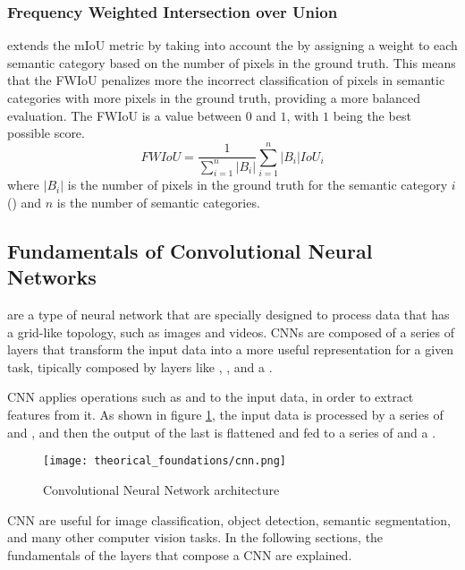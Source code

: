     \subsubsection{Frequency Weighted Intersection over Union}

       extends the mIoU metric
      by taking into account the  by assigning a weight
      to each semantic category based on the number of pixels in the ground truth. This
      means that the FWIoU penalizes more the incorrect classification of pixels in
      semantic categories with more pixels in the ground truth, providing a more balanced
      evaluation\cite{lin2017refinenet,long2015fully}. The FWIoU is a value between $0$
      and $1$, with $1$ being the best possible score.
      \begin{equation}
        \label{eq:fwiou}
        FWIoU = \frac{1}{\sum_{i=1}^{n} |B_i|} \sum_{i=1}^{n} |B_i| IoU_i
      \end{equation}
      where $|B_i|$ is the number of pixels in the ground truth for the semantic
      category $i$ () and $n$ is the number of semantic categories.

  \subsection{Fundamentals of Convolutional Neural Networks}

     are a type of neural network that
    are specially designed to process data that has a grid-like topology, such as
    images and videos\cite{goodfellow2016deep}. CNNs are composed of a series of layers that
    transform the input data into a more useful representation for a given task,
    tipically composed by layers like , ,
    and a .

    CNN applies operations such as  and  to the input data,
    in order to extract features from it. As shown in figure \ref{fig:convolutional_neural_network},
    the input data is processed by a series of  and ,
    and then the output of the last  is flattened and fed to a series
    of  and a \cite{goodfellow2016deep, intelligence2021modern}.
    \begin{figure}[htbp]
      \centering
      \texttt{[image: theorical\_foundations/cnn.png]}
      \caption{Convolutional Neural Network architecture}
      \label{fig:convolutional_neural_network}
    \end{figure}
    CNN are useful for image classification, object detection, semantic segmentation,
    and many other computer vision tasks\cite{goodfellow2016deep, intelligence2021modern}.
    In the following sections, the fundamentals of the layers that compose a CNN are
    explained.

